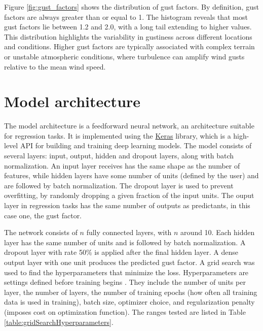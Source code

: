 Figure \ref{fig:gust_factors} shows the distribution of gust factors. By definition, gust factors are always greater than or equal to 1. The histogram reveals that most gust factors lie between 1.2 and 2.0, with a long tail extending to higher values. This distribution highlights the variability in gustiness across different locations and conditions. Higher gust factors are typically associated with complex terrain or unstable atmospheric conditions, where turbulence can amplify wind gusts relative to the mean wind speed.

\section{Model architecture}
\label{sec:model_architecture}

The model architecture is a feedforward neural network, an architecture suitable for regression tasks. It is implemented using the \href{https://keras.io/}{Keras} library, which is a high-level API for building and training deep learning models. The model consists of several layers: input, output, hidden and dropout layers, along with batch normalization. An input layer receives has the same shape as the number of features, while hidden layers have some number of units (defined by the user) and are followed by batch normalization. The dropout layer is used to prevent overfitting, by randomly dropping a given fraction of the input units. The ouput layer in regression tasks has the same number of outputs as predictants, in this case one, the gust factor.

The network consists of $n$ fully connected layers, with $n$ around 10. Each hidden layer has the same number of units and is followed by batch normalization. A dropout layer with rate 50\% is applied after the final hidden layer. A dense output layer with one unit produces the predicted gust factor. A grid search was used to find the hyperparameters that minimize the loss. Hyperparameters are settings defined before training begins \parencite{hyperparameters_definition}. They include the number of units per layer, the number of layers, the number of training epochs (how often all training data is used in training), batch size, optimizer choice, and regularization penalty (imposes cost on optimization function). The ranges tested are listed in Table \ref{table:gridSearchHyperparameters}.

